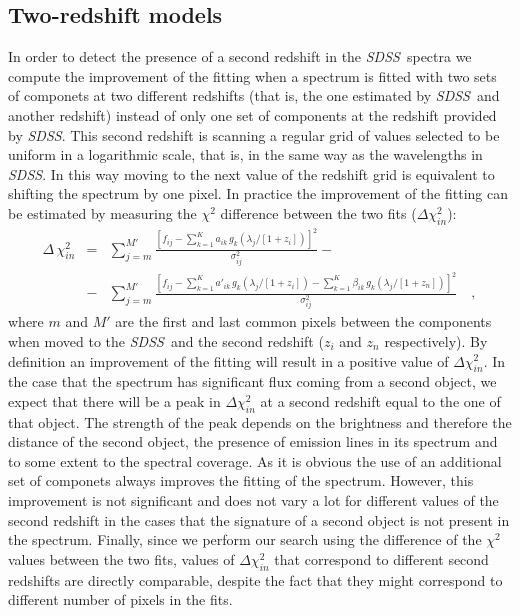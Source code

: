 \documentclass[12pt,preprint]{aastex}
\newcommand{\project}[1]{\textsl{#1}}
\newcommand{\sdss}{\project{SDSS}}
\newcommand{\SDSS}{\sdss}
\begin{document}
\subsection{Two-redshift models}\label{sec:tworedshifts}
In order to detect the presence of a second redshift in the \SDSS\ 
spectra we compute the improvement of the fitting when a spectrum is
fitted with two sets of componets at two different redshifts (that is, the
one estimated by \SDSS\ and another redshift) instead of only one set of
components at the redshift provided by \SDSS. This second redshift is
scanning a regular grid of values selected to be uniform in a
logarithmic scale, that is, in the same way as the wavelengths in \SDSS. In
this way moving to the next value of the redshift grid is equivalent
to shifting the spectrum by one pixel. In practice the improvement of
the fitting can be estimated by measuring the $\chi^2$ difference
between the two fits ($\Delta\chi_{in}^2$):
\begin{eqnarray}\label{eq:deltachi-squared}\displaystyle
\Delta\,\chi_{in}^2 & = & \sum_{j=m}^{M'}
             \frac{\left[f_{ij}-\sum_{k=1}^K a_{ik}
                      \,g_k(\lambda_j/[1+z_i])\right]^2}
{\sigma^2_{ij}} - \nonumber\\ 
& - & \sum_{j=m}^{M'}
             \frac{\left[f_{ij}-\sum_{k=1}^K a'_{ik}
                      \,g_k(\lambda_j/[1+z_i])-\sum_{k=1}^K \beta_{ik}
                      \,g_k(\lambda_j/[1+z_n])\right]^2}
{\sigma^2_{ij}}
\quad ,
\end{eqnarray}
where $m$ and $M'$ are the first and last common pixels between the
components when moved to the \SDSS\ and the second redshift ($z_i$ and
$z_n$ respectively). By definition an improvement of the fitting will 
result in a positive value of $\Delta\chi_{in}^2$. In the case that 
the spectrum has significant flux coming from a second object, 
we expect that there will be a peak in $\Delta\chi_{in}^2$ at a second 
redshift equal to the one of that object. The strength of the peak depends 
on the brightness and therefore the distance of the second object, the 
presence of emission lines in its spectrum and to some extent to the 
spectral coverage. As it is obvious the use of an additional set of 
componets always improves the fitting of the spectrum. However, this 
improvement is not significant and does not vary a lot for different 
values of the second redshift in the cases that the signature of a second 
object is not present in the spectrum. Finally, since we perform our search 
using the difference of the $\chi^2$ values between the two fits, values of
$\Delta\chi_{in}^2$ that correspond to different second redshifts are
directly comparable, despite the fact that they might correspond to
different number of pixels in the fits.
\end{document}
